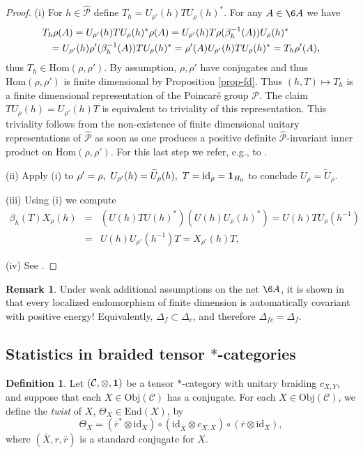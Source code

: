 \documentclass[12pt]{article}
\theoremstyle{definition}
\theoremstyle{definition}
\newtheorem{defn}[thm]{Definition}
\newtheorem{note}[thm]{Remark}
\theoremstyle{remark}
\newcommand{\Obj}{\mathrm{Obj}}
\def\2#1{{\mathcal #1}}
\def\1#1{{\bf #1}}
\def\ol#1{{\overline #1}}
\newcommand{\Hom}{\mathrm{Hom}}
\newcommand{\End}{\mathrm{End}}
\def\id{\mathrm{id}}
\begin{document}
\begin{proof} (i) For $h\in\widehat{\2P}$ define $T_h=U_{\rho'}(h)TU_\rho(h)^*$. For any $A\in\6A$
we have 
\begin{eqnarray*} \lefteqn{  T_h\rho(A) = U_{\rho'}(h)TU_\rho(h)^*\rho(A)
   = U_{\rho'}(h)T\rho(\beta_h^{-1}(A))U_\rho(h)^* } \\
   &&=U_{\rho'}(h)\rho'(\beta_h^{-1}(A))TU_\rho(h)^*=\rho'(A)U_{\rho'}(h)TU_\rho(h)^*=T_h\rho'(A), 
\end{eqnarray*}
thus $T_h\in\Hom(\rho,\rho')$. By assumption, $\rho,\rho'$ have conjugates and thus
$\Hom(\rho,\rho')$ is finite dimensional by Proposition \ref{prop-fd}. Thus $(h,T)\mapsto T_h$ is a
finite dimensional representation of the Poincar\'e group $\2P$. The claim
$TU_\rho(h)=U_{\rho'}(h)T$ is equivalent to triviality of this representation. This triviality
follows from the non-existence of finite dimensional unitary representations of $\widehat{\2P}$ as
soon as one produces a positive definite $\widehat{\2P}$-invariant inner product on
$\Hom(\rho,\rho')$. For this last step we refer, e.g., to \cite{rob-lec}. 

(ii) Apply (i) to $\rho'=\rho,\ U_{\rho'}(h)=\widetilde{U}_\rho(h),\ T=\id_\rho=\11_{H_0}$ to conclude
$U_\rho=\widetilde{U}_\rho$. 

(iii) Using (i) we compute
\begin{eqnarray*} \beta_h(T)X_\rho(h) &=& (U(h)TU(h)^*)(U(h)U_\rho(h)^*)=U(h)TU_\rho(h^{-1}) \\
   &=& U(h)U_{\rho'}(h^{-1})T=X_{\rho'}(h)T, \end{eqnarray*}

(iv) See \cite{rob-lec}.
\end{proof}

\begin{note}  \label{note-cov2}
Under weak additional assumptions on the net $\6A$, it is shown in \cite[Theorem 5.2]{guido-longo}
that every localized endomorphism of finite dimension is automatically covariant with positive
energy! Equivalently, $\Delta_f\subset\Delta_c$, and therefore $\Delta_{fc}=\Delta_f$.
\end{note}


\subsection{Statistics in braided tensor $*$-categories} \label{cat-stats}

\begin{defn} Let $(\2C ,\otimes ,\11 )$ be a tensor
  $*$-category with unitary braiding $c_{X,Y}$, and
  suppose that each $X\in \Obj (\2C )$ has a conjugate.
  For each $X\in \Obj (\2C )$, we define the
  \emph{twist} of $X$, $\Theta _X\in \End (X)$, by
$$ \Theta _X = (\ol r^*\otimes \id _X)\circ (\id _{\ol X}\otimes c_{X,X})\circ
(\ol r\otimes \id _{X} ) ,$$ where $(\ol X,r,\ol r)$ is
a standard conjugate for $X$.
\end{defn}
\end{document}
